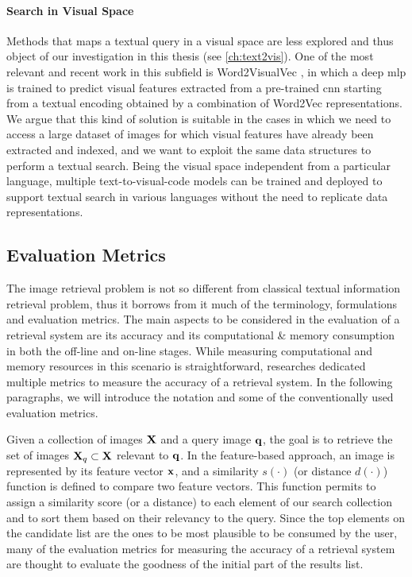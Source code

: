 \paragraph{Search in Visual Space}
Methods that maps a textual query in a visual space are less explored and thus object of our investigation in this thesis (see \ref{ch:text2vis}).
One of the most relevant and recent work in this subfield is Word2VisualVec \cite{dong2018predicting}, in which a deep \gls{mlp} is trained to predict visual features extracted from a pre-trained \gls{cnn} starting from a textual encoding obtained by a combination of Word2Vec representations.
We argue that this kind of solution is suitable in the cases in which we need to access a large dataset of images for which visual features have already been extracted and indexed, and we want to exploit the same data structures to perform a textual search.
Being the visual space independent from a particular language, multiple text-to-visual-code models can be trained and deployed to support textual search in various languages without the need to replicate data representations.

\subsection{Evaluation Metrics}
\label{subsec:back:ir-metrics}
The image retrieval problem is not so different from classical textual information retrieval problem, thus it borrows from it much of the terminology, formulations and evaluation metrics.
The main aspects to be considered in the evaluation of a retrieval system are its accuracy and its computational \& memory consumption in both the off-line and on-line stages.
While measuring computational and memory resources in this scenario is straightforward, researches dedicated multiple metrics to measure the accuracy of a retrieval system.
In the following paragraphs, we will introduce the notation and some of the conventionally used evaluation metrics.

Given a collection of images $\mathbf{X}$ and a query image $\mathbf{q}$, the goal is to retrieve the set of images $\mathbf{X}_q \subset \mathbf{X}$ relevant to $\mathbf{q}$.
In the feature-based approach, an image is represented by its feature vector $\mathbf{x}$, and a similarity $s(\cdot)$ (or distance $d(\cdot)$) function is defined to compare two feature vectors.
This function permits to assign a similarity score (or a distance) to each element of our search collection and to sort them based on their relevancy to the query.
Since the top elements on the candidate list are the ones to be most plausible to be consumed by the user, many of the evaluation metrics for measuring the accuracy of a retrieval system are thought to evaluate the goodness of the initial part of the results list.

